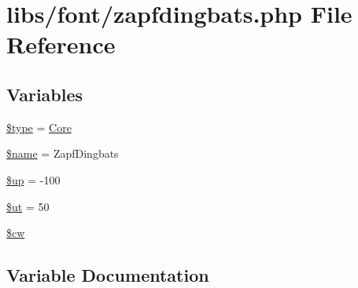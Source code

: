 \hypertarget{zapfdingbats_8php}{}\section{libs/font/zapfdingbats.php File Reference}
\label{zapfdingbats_8php}
\subsection*{Variables}
\begin{DoxyCompactItemize}
\item 
\hyperlink{zapfdingbats_8php_a9a4a6fba2208984cabb3afacadf33919}{\$type} = \textquotesingle{}\hyperlink{class_core}{Core}\textquotesingle{}
\item 
\hyperlink{zapfdingbats_8php_ab2fc40d43824ea3e1ce5d86dee0d763b}{\$name} = \textquotesingle{}Zapf\+Dingbats\textquotesingle{}
\item 
\hyperlink{zapfdingbats_8php_a6b5ad2ac55f9df46e8f34e78fbd6f176}{\$up} = -\/100
\item 
\hyperlink{zapfdingbats_8php_aadd3f841051043ee58e587e840e8dd0b}{\$ut} = 50
\item 
\hyperlink{zapfdingbats_8php_ac2951b03dbb0317e6c61ec920b7479dc}{\$cw}
\end{DoxyCompactItemize}


\subsection{Variable Documentation}
\hypertarget{zapfdingbats_8php_ac2951b03dbb0317e6c61ec920b7479dc}{}
